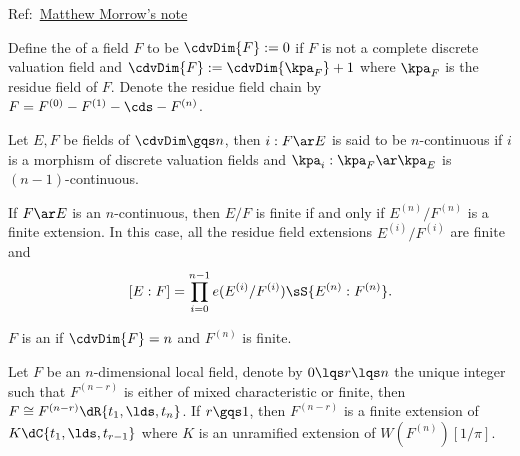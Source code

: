 \documentclass[0-main]{subfiles}
\begin{document}
\ifSubfilesClassLoaded{
	\tableofcontents
}{}



Ref:~\href{https://www.imo.universite-paris-saclay.fr/~matthew.morrow/Morrow,%20M.,%20Introduction%20to%20HLF.pdf}{Matthew Morrow's note}

\begin{dfn}[Definition~2.1]
	Define the  of a field $F$ to be $\cdvDim{F}:=0$ if $F$ is not a complete discrete valuation field and $\cdvDim{F}:=\cdvDim{\kpa_{F}}+1$ where $\kpa_{F}$ is the residue field of $F$. Denote the residue field chain by $F=F^{(0)}- F^{(1)}- \cds - F^{(n)}$.

\end{dfn}

\begin{thm}
	Let $E,F$ be fields of $\cdvDim\gqs n$, then $i:F\ar E$ is said to be $n$-continuous if $i$ is a morphism of discrete valuation fields and $\kpa_{i}:\kpa_{F}\ar\kpa_{E}$ is $(n-1)$-continuous.

	If $F\ar E$ is an $n$-continuous, then $E/F$ is finite if and only if $E^{(n)}/F^{(n)}$ is a finite extension. In this case, all the residue field extensions $E^{(i)}/F^{(i)}$ are finite and
	\[
		[E:F]=\prod_{i=0}^{n-1}e(E^{(i)}/F^{(i)})\sS{E^{(n)}:F^{(n)}}.
	\]
\end{thm}

\begin{dfn}[Definition~2.12]
	$F$ is an  if $\cdvDim{F}=n$ and $F^{(n)}$ is finite.

\end{dfn}

\begin{thm}
	Let $F$ be an $n$-dimensional local field, denote by $0\lqs r\lqs n$ the unique integer such that $F^{(n-r)}$ is either of mixed characteristic or finite, then $F\cong F^{(n-r)}\dR{t_{1},\lds,t_{n}}$. If $r\gqs1$, then $F^{(n-r)}$ is a finite extension of $K\dC{t_{1},\lds,t_{r-1}}$ where $K$ is an unramified extension of $W(F^{(n)})[1/\pi]$.
\end{thm}
\end{document}
